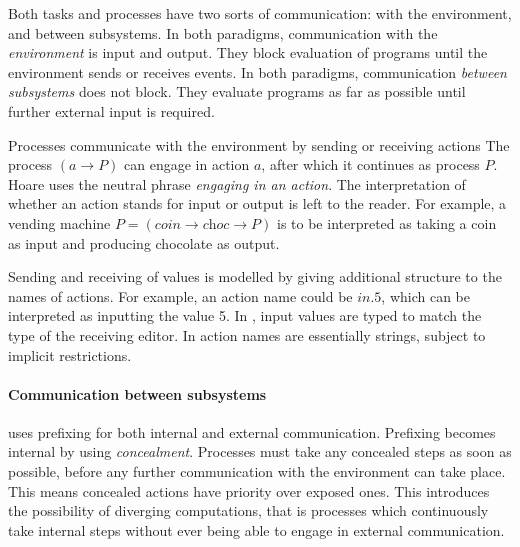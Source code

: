 Both tasks and processes have two sorts of communication: with the environment, and between subsystems.
In both paradigms, communication with the \emph{environment} is input and output.
They block evaluation of programs until the environment sends or receives events.
In both paradigms, communication \emph{between subsystems} does not block.
They evaluate programs as far as possible until further external input is required.

Processes communicate with the environment by sending or receiving actions
The \CSP process $(a \to P)$ can engage in action $a$, after which it continues as process $P$.
Hoare uses the neutral phrase \emph{engaging in an action}.
The interpretation of whether an action stands for input or output is left to the reader.
For example, a vending machine $P = (\textit{coin} \to \textit{choc} \to P)$ is to be interpreted as taking a coin as input and producing chocolate as output.

Sending and receiving of values is modelled by giving additional structure to the names of actions.
For example, an action name could be $\textit{in}.5$, which can be interpreted as inputting the value 5.
%
In \TOP, input values are typed to match the type of the receiving editor.
In \CSP action names are essentially strings, subject to implicit restrictions.



\paragraph{Communication between subsystems}

%
\CSP uses prefixing for both internal and external communication.
Prefixing becomes internal by using \emph{concealment}.
Processes must take any concealed steps as soon as possible, before any further communication with the environment can take place.
This means concealed actions have priority over exposed ones.
This introduces the possibility of diverging computations, that is processes which continuously take internal steps without ever being able to engage in external communication.


